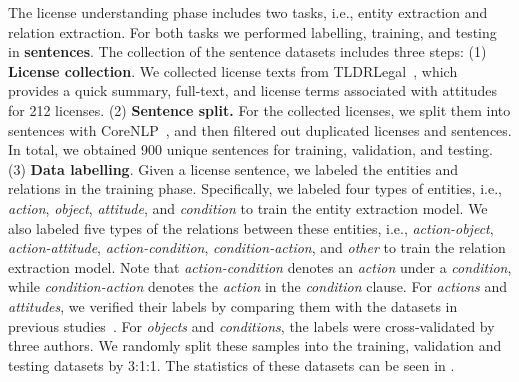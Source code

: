 The license understanding phase includes two tasks, i.e., entity extraction and relation extraction. For both tasks we performed labelling, training, and testing in \textbf{sentences}. The collection of the sentence datasets includes three steps: (1) \textbf{License collection}. We collected license texts from TLDRLegal~\cite{tldrlegal}, which provides a quick summary, full-text, and license terms associated with attitudes for 212 licenses. (2) \textbf{Sentence split.} For the collected licenses, we split them into sentences with CoreNLP~\cite{url-corenlp}, and then filtered out duplicated licenses and sentences. In total, we obtained 900 unique sentences for training, validation, and testing. (3) \textbf{Data labelling}. Given a license sentence, we labeled the entities and relations in the training phase. Specifically, we labeled four types of entities, i.e., \textit{action}, \textit{object}, \textit{attitude}, and \textit{condition} to train the entity extraction model. We also labeled five types of the relations between these entities, i.e., \textit{action-object}, \textit{action-attitude}, \textit{action-condition}, \textit{condition-action}, and \textit{other} to train the relation extraction model. Note that \textit{action-condition} denotes an \textit{action} under a \textit{condition}, while \textit{condition-action} denotes the \textit{action} in the \textit{condition} clause. 
For \textit{actions} and \textit{attitudes}, we verified their labels by comparing them with the datasets in previous studies~\cite{tldrlegal,xu2021lidetector}. For \textit{objects} and \textit{conditions}, the labels were cross-validated by three authors. 
{We randomly split these samples into the training, validation and testing datasets by 3:1:1.} 
The statistics of these datasets can be seen in .

